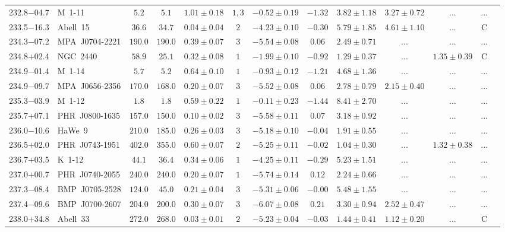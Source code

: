 \documentclass[useAMS]{mn2e}
\begin{document}
\begin{center}
{\begin{longtable}{llccccccccccc}
232.8$-$04.7&M~1-11&$       5.2$&$       5.1$&$1.01 \pm 0.18$&$1,3$&$-0.52 \pm 0.19$&$     -1.32$&$3.82 \pm 1.18$&$3.27 \pm 0.72$&$...$&...\\
233.5$-$16.3&Abell~15&$      36.6$&$      34.7$&$0.04 \pm 0.04$&$2$&$-4.23 \pm 0.10$&$     -0.30$&$5.79 \pm 1.85$&$4.61 \pm 1.10$&$...$&C\\
234.3$-$07.2&MPA~J0704-2221&$     190.0$&$     190.0$&$0.39 \pm 0.07$&$3$&$-5.54 \pm 0.08$&$      0.06$&$2.49 \pm 0.71$&$...$&$...$&...\\
234.8$+$02.4&NGC~2440&$      58.9$&$      25.1$&$0.32 \pm 0.08$&$1$&$-1.99 \pm 0.10$&$     -0.92$&$1.29 \pm 0.37$&$...$&$1.35 \pm 0.39$&C\\
234.9$-$01.4&M~1-14&$       5.7$&$       5.2$&$0.64 \pm 0.10$&$1$&$-0.93 \pm 0.12$&$     -1.21$&$4.68 \pm 1.36$&$...$&$...$&...\\
234.9$-$09.7&MPA~J0656-2356&$     170.0$&$     168.0$&$0.20 \pm 0.07$&$3$&$-5.52 \pm 0.08$&$      0.06$&$2.78 \pm 0.79$&$2.15 \pm 0.40$&$...$&...\\
235.3$-$03.9&M~1-12&$       1.8$&$       1.8$&$0.59 \pm 0.22$&$1$&$-0.11 \pm 0.23$&$     -1.44$&$8.41 \pm 2.70$&$...$&$...$&...\\
235.7$+$07.1&PHR~J0800-1635&$     157.0$&$     150.0$&$0.10 \pm 0.02$&$3$&$-5.58 \pm 0.11$&$      0.07$&$3.18 \pm 0.92$&$...$&$...$&...\\
236.0$-$10.6&HaWe~9&$     210.0$&$     185.0$&$0.26 \pm 0.03$&$3$&$-5.18 \pm 0.10$&$     -0.04$&$1.91 \pm 0.55$&$...$&$...$&...\\
236.5$+$02.0&PHR~J0743-1951&$     402.0$&$     355.0$&$0.60 \pm 0.07$&$2$&$-5.25 \pm 0.11$&$     -0.02$&$1.04 \pm 0.30$&$...$&$1.32 \pm 0.38$&...\\
236.7$+$03.5&K~1-12&$      44.1$&$      36.4$&$0.34 \pm 0.06$&$1$&$-4.25 \pm 0.11$&$     -0.29$&$5.23 \pm 1.51$&$...$&$...$&...\\
237.0$+$00.7&PHR~J0740-2055&$     240.0$&$     240.0$&$0.20 \pm 0.07$&$1$&$-5.74 \pm 0.14$&$      0.12$&$2.24 \pm 0.66$&$...$&$...$&...\\
237.3$-$08.4&BMP~J0705-2528&$     124.0$&$      45.0$&$0.21 \pm 0.04$&$3$&$-5.31 \pm 0.06$&$     -0.00$&$5.48 \pm 1.55$&$...$&$...$&...\\
237.4$-$09.6&BMP~J0700-2607&$     204.0$&$     200.0$&$0.30 \pm 0.07$&$3$&$-6.07 \pm 0.08$&$      0.21$&$3.30 \pm 0.94$&$2.52 \pm 0.47$&$...$&...\\
238.0$+$34.8&Abell~33&$     272.0$&$     268.0$&$0.03 \pm 0.01$&$2$&$-5.23 \pm 0.04$&$     -0.03$&$1.44 \pm 0.41$&$1.12 \pm 0.20$&$...$&C\\

\end{longtable}}
\end{center}
\end{document}
